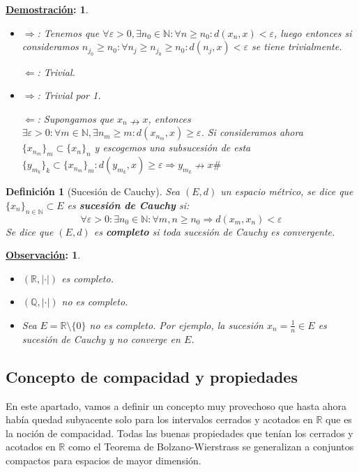 \documentclass[10pt,a4paper,openright]{book}
\theoremstyle{break}
\newtheorem*{defi}{Definición}
\newtheorem*{demo}{\underline{Demostración}:}
\newtheorem*{obs}{\underline{Observación}:}
\begin{document}
\begin{demo}
\begin{itemize}
\item $\Rightarrow$: Tenemos que $\forall \varepsilon > 0, \exists n_0 \in \mathbb{N} : \forall n \geq n_0 : d(x_n,x) < \varepsilon$, luego entonces si consideramos $n_{j_0} \geq n_0 : \forall n_j \geq n_{j_0} \geq n_0 : d(n_{j}, x) < \varepsilon$ se tiene trivialmente.

$\Leftarrow$: Trivial.

\item  $\Rightarrow$: Trivial por 1.

$\Leftarrow$: Supongamos que $x_n  \nrightarrow x$, entonces $\exists \varepsilon > 0 : \forall m \in \mathbb{N}, \exists n_m \geq m : d(x_{n_m}, x) \geq \varepsilon$. Si consideramos ahora $\{x_{n_m}\}_m \subset \{x_n\}_n$ y escogemos una subsucesión de esta $\{y_{m_k}\}_k \subset \{x_{n_m}\}_m : d(y_{m_k}, x) \geq \varepsilon\Rightarrow y_{m_k} \nrightarrow x \#$
\end{itemize}
\end{demo}

\begin{defi}[Sucesión de Cauchy]
Sea $(E,d)$ un espacio métrico, se dice que $\{x_n\}_{n\in \mathbb{N}} \subset E$ es \textbf{sucesión de Cauchy} si:
$$\forall \varepsilon > 0: \exists n_0 \in \mathbb{N} : \forall m,n \geq n_0 \Rightarrow d(x_m, x_n) < \varepsilon$$
Se dice que $(E,d)$ es \textbf{completo} si toda sucesión de Cauchy es convergente.
\end{defi}

\begin{obs}
\begin{itemize}
\item $(\mathbb{R}, |\cdot|)$ es completo.

\item $(\mathbb{Q}, |\cdot|)$ no es completo.

\item Sea $E = \mathbb{R} \setminus \{0\}$ no es completo. Por ejemplo, la sucesión $x_n = \frac{1}{n} \in E$ es sucesión de Cauchy y no converge en $E$.
\end{itemize}
\end{obs}

\subsection{Concepto de compacidad y propiedades}
En este apartado, vamos a definir un concepto muy provechoso que hasta ahora había quedad subyacente solo para los intervalos cerrados y acotados en $\mathbb{R}$ que es la noción de compacidad. Todas las buenas propiedades que tenían los cerrados y acotados en $\mathbb{R}$ como el Teorema de Bolzano-Wierstrass se generalizan a conjuntos compactos para espacios de mayor dimensión.
\end{document}
